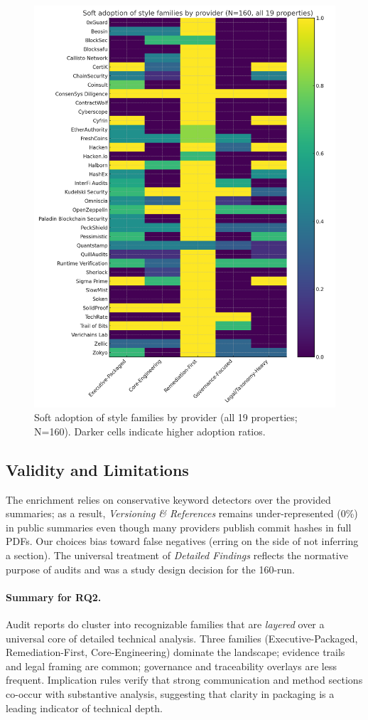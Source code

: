 \begin{figure}[t]
  \centering
  \includegraphics[width=0.95\linewidth]{figure_soft_adoption_heatmap_160_all19.png}
  \caption{Soft adoption of style families by provider (all 19 properties; N=160). Darker cells indicate higher adoption ratios.}
  \label{fig:rq2-heatmap}
\end{figure}

\subsection{Validity and Limitations}
The enrichment relies on conservative keyword detectors over the provided summaries; as a result, \emph{Versioning \& References}
remains under-represented (0\%) in public summaries even though many providers publish commit hashes in full PDFs.
Our choices bias toward false negatives (erring on the side of not inferring a section). The universal treatment of \emph{Detailed Findings}
reflects the normative purpose of audits and was a study design decision for the 160-run.

\paragraph{Summary for RQ2.}
Audit reports do cluster into recognizable families that are \emph{layered} over a universal core of detailed technical analysis.
Three families (Executive-Packaged, Remediation-First, Core-Engineering) dominate the landscape; evidence trails and legal framing are common;
governance and traceability overlays are less frequent. Implication rules verify that strong communication and method sections co-occur with substantive analysis,
suggesting that clarity in packaging is a leading indicator of technical depth.
